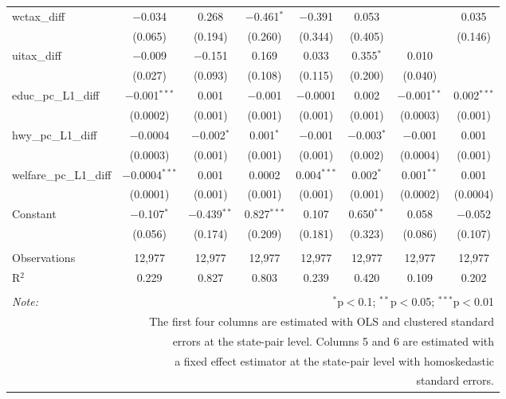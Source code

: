 \begin{table}[!htbp]
\begin{tabular}{@{\extracolsep{5pt}}lccccccc}
  wctax\_diff & $-$0.034 & 0.268 & $-$0.461$^{*}$ & $-$0.391 & 0.053 &  & 0.035 \\ 
  & (0.065) & (0.194) & (0.260) & (0.344) & (0.405) &  & (0.146) \\ 
  uitax\_diff & $-$0.009 & $-$0.151 & 0.169 & 0.033 & 0.355$^{*}$ & 0.010 &  \\ 
  & (0.027) & (0.093) & (0.108) & (0.115) & (0.200) & (0.040) &  \\ 
  educ\_pc\_L1\_diff & $-$0.001$^{***}$ & 0.001 & $-$0.001 & $-$0.0001 & 0.002 & $-$0.001$^{**}$ & 0.002$^{***}$ \\ 
  & (0.0002) & (0.001) & (0.001) & (0.001) & (0.001) & (0.0003) & (0.001) \\ 
  hwy\_pc\_L1\_diff & $-$0.0004 & $-$0.002$^{*}$ & 0.001$^{*}$ & $-$0.001 & $-$0.003$^{*}$ & $-$0.001 & 0.001 \\ 
  & (0.0003) & (0.001) & (0.001) & (0.001) & (0.002) & (0.0004) & (0.001) \\ 
  welfare\_pc\_L1\_diff & $-$0.0004$^{***}$ & 0.001 & 0.0002 & 0.004$^{***}$ & 0.002$^{*}$ & 0.001$^{**}$ & 0.001 \\ 
  & (0.0001) & (0.001) & (0.001) & (0.001) & (0.001) & (0.0002) & (0.0004) \\ 
  Constant & $-$0.107$^{*}$ & $-$0.439$^{**}$ & 0.827$^{***}$ & 0.107 & 0.650$^{**}$ & 0.058 & $-$0.052 \\ 
  & (0.056) & (0.174) & (0.209) & (0.181) & (0.323) & (0.086) & (0.107) \\ 
 \hline \\[-1.8ex] 
Observations & 12,977 & 12,977 & 12,977 & 12,977 & 12,977 & 12,977 & 12,977 \\ 
R$^{2}$ & 0.229 & 0.827 & 0.803 & 0.239 & 0.420 & 0.109 & 0.202 \\ 
\hline 
\hline \\[-1.8ex] 
\textit{Note:}  & \multicolumn{7}{r}{$^{*}$p$<$0.1; $^{**}$p$<$0.05; $^{***}$p$<$0.01} \\ 
 & \multicolumn{7}{r}{The first four columns are estimated with OLS and clustered standard} \\ 
 & \multicolumn{7}{r}{ errors at the state-pair level. Columns 5 and 6 are estimated with} \\ 
 & \multicolumn{7}{r}{a fixed effect estimator at the state-pair level with homoskedastic} \\ 
 & \multicolumn{7}{r}{standard errors.} \\ 
\end{tabular} 
\end{table} 
